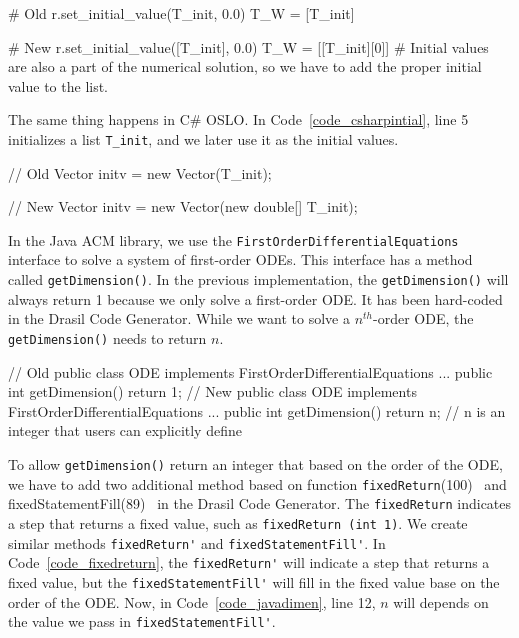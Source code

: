 \begin{listing}
\begin{python1}
# Old 
  r.set_initial_value(T_init, 0.0)
  T_W = [T_init]

# New 
  r.set_initial_value([T_init], 0.0)
  T_W = [[T_init][0]] # Initial values are also a part of the numerical solution, so we have to add the proper initial value to the list.
\end{python1}
\label{code_pythonintial}
\end{listing}
The same thing happens in C\# OSLO. In Code~\ref{code_csharpintial}, line 5 initializes a list \verb|T_init|, and we later use it as the initial values.  
\begin{listing}[ht]
\begin{csharp1}
// Old 
Vector initv = new Vector(T_init);

// New 
Vector initv = new Vector(new double[] {T_init});
\end{csharp1}
\label{code_csharpintial}
\end{listing}

In the Java ACM library, we use the \verb|FirstOrderDifferentialEquations| interface to solve a system of first-order ODEs. This interface has a method called \verb|getDimension()|. In the previous implementation, the \verb|getDimension()| will always return 1 because we only solve a first-order ODE. It has been hard-coded in the Drasil Code Generator. While we want to solve a $n^{th}$-order ODE, the \verb|getDimension()| needs to return $n$.

\begin{listing}
\begin{java1}
// Old 
public class ODE implements FirstOrderDifferentialEquations {
  ...
  public int getDimension() {
    return 1;
  }
}
// New 
public class ODE implements FirstOrderDifferentialEquations {
  ...
  public int getDimension() {
    return n; // n is an integer that users can explicitly define
  }
}
\end{java1}
\label{code_javadimen}
\end{listing}

To allow \verb|getDimension()| return an integer that based on the order of the ODE, we have to add two additional method based on function \verb|fixedReturn|(100)~\citep{brooks} and fixedStatementFill(89)~\citep{brooks} in the Drasil Code Generator. The \verb|fixedReturn| indicates a step that returns a fixed value, such as \verb|fixedReturn (int 1)|. We create similar methods \verb|fixedReturn'| and \verb|fixedStatementFill'|. In Code~\ref{code_fixedreturn}, the \verb|fixedReturn'| will indicate a step that returns a fixed value, but the \verb|fixedStatementFill'| will fill in the fixed value base on the order of the ODE. Now, in Code~\ref{code_javadimen}, line 12, $n$ will depends on the value we pass in \verb|fixedStatementFill'|.

